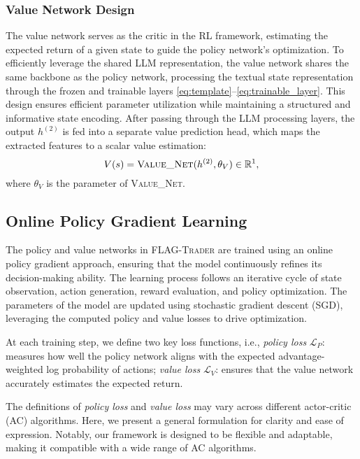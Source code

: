 \subsubsection{Value Network Design}
The value network serves as the critic in the RL framework, estimating the expected return of a given state to guide the policy network's optimization. To efficiently leverage the shared LLM representation, the value network shares the same backbone as the policy network, processing the textual state representation through the frozen and trainable layers  \eqref{eq:template}–\eqref{eq:trainable_layer}. This design ensures efficient parameter utilization while maintaining a structured and informative state encoding. 
After passing through the LLM processing layers, the output 
$h^{(2)}$  is fed into a separate value prediction head, which maps the extracted features to a scalar value estimation:
\begin{equation}
V(s) = \textsc{Value\_Net}(h^{(2)}, \theta_V)\in\mathbb{R}^{1},
\label{eq:value_pred}
\end{equation}
where $\theta_V$ is the parameter of \textsc{Value\_Net}.


\subsection{Online Policy Gradient Learning}
The policy and value networks in \textsc{FLAG-Trader} are trained using an online policy gradient approach, ensuring that the model continuously refines its decision-making ability. The learning process follows an iterative cycle of state observation, action generation, reward evaluation, and policy optimization. The parameters of the model are updated using stochastic gradient descent (SGD), leveraging the computed policy and value losses to drive optimization.

At each training step, we define two key loss functions, i.e.,
\emph{policy loss} 
$\mathcal{L}_P$: measures how well the policy network aligns with the expected advantage-weighted log probability of actions; 
\emph{value loss} $\mathcal{L}_V$: ensures that the value network accurately estimates the expected return.

\begin{remark}
The definitions of \emph{policy loss} and \emph{value loss} may vary across different actor-critic (AC) algorithms. Here, we present a general formulation for clarity and ease of expression. Notably, our framework is designed to be flexible and adaptable, making it compatible with a wide range of AC algorithms.
\end{remark}



